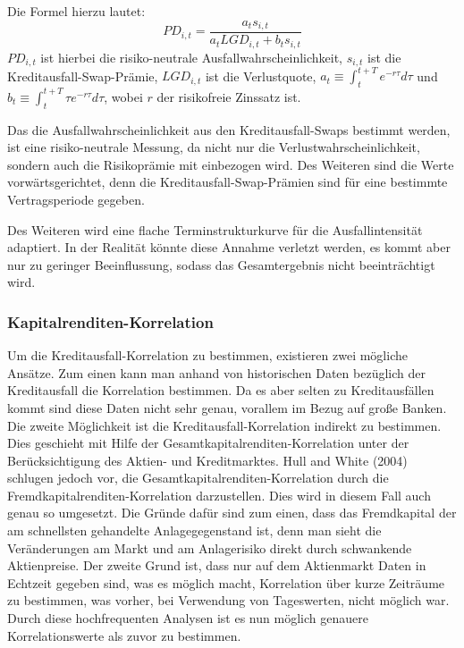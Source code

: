 \documentclass[a4paper,12pt]{scrartcl}
\begin{document}
Die Formel hierzu lautet: 
\begin{equation}
PD_{i,t}=\frac{a_t s_{i,t}}{a_t LGD_{i,t}+b_t s_{i,t}}
\end{equation}
$PD_{i,t}$ ist hierbei die risiko-neutrale Ausfallwahrscheinlichkeit, $s_{i,t}$ ist die Kreditausfall-Swap-Prämie, $LGD_{i,t}$ ist die Verlustquote, $a_t \equiv \int_{t}^{t+T} e^{-r \tau}d \tau$ und $b_t \equiv \int_{t}^{t+T} \tau e^{-r \tau}d \tau$, wobei $r$ der risikofreie Zinssatz ist.

Das die Ausfallwahrscheinlichkeit aus den Kreditausfall-Swaps bestimmt werden, ist eine risiko-neutrale Messung, da nicht nur die Verlustwahrscheinlichkeit, sondern auch die Risikoprämie mit einbezogen wird. Des Weiteren sind die Werte vorwärtsgerichtet, denn die Kreditausfall-Swap-Prämien sind für eine bestimmte Vertragsperiode gegeben. 

Des Weiteren wird eine flache Terminstrukturkurve für die Ausfallintensität adaptiert. In der Realität könnte diese Annahme verletzt werden, es kommt aber nur zu geringer Beeinflussung, sodass das Gesamtergebnis nicht beeinträchtigt wird.
\newpage
\subsubsection{Kapitalrenditen-Korrelation}
Um die Kreditausfall-Korrelation zu bestimmen, existieren zwei mögliche Ansätze.
Zum einen kann man anhand von historischen Daten bezüglich der Kreditausfall die Korrelation bestimmen. Da es aber selten zu Kreditausfällen kommt sind diese Daten nicht sehr genau, vorallem im Bezug auf große Banken.
Die zweite Möglichkeit ist die Kreditausfall-Korrelation indirekt zu bestimmen. Dies geschieht mit Hilfe der Gesamtkapitalrenditen-Korrelation unter der Berücksichtigung des Aktien- und Kreditmarktes. Hull and White (2004) schlugen jedoch vor, die Gesamtkapitalrenditen-Korrelation durch die Fremdkapitalrenditen-Korrelation darzustellen. Dies wird in diesem Fall auch genau so umgesetzt. Die Gründe dafür sind zum einen, dass das Fremdkapital der am schnellsten gehandelte Anlagegegenstand ist, denn man sieht die Veränderungen am Markt und am Anlagerisiko direkt durch schwankende Aktienpreise. Der zweite Grund ist, dass nur auf dem Aktienmarkt Daten in Echtzeit gegeben sind, was es möglich macht, Korrelation über kurze Zeiträume zu bestimmen, was vorher, bei Verwendung von Tageswerten, nicht möglich war.
Durch diese hochfrequenten Analysen ist es nun möglich genauere Korrelationswerte als zuvor zu bestimmen.
\end{document}
